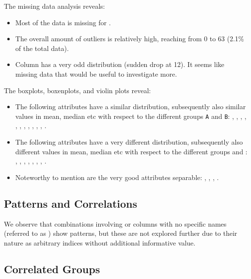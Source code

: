 The missing data analysis reveals:
\begin{itemize}
  \item Most of the data is missing for .
  \item The overall amount of outliers is relatively high, reaching from 0 to 63 (2.1\% of the total data).
  \item Column  has a very odd distribution (sudden drop at 12). It seems like missing data that would be useful to investigate more.
\end{itemize}

The boxplots, boxenplots, and violin plots reveal:
\begin{itemize}
  \item The following attributes have a similar distribution, subsequently also similar values in mean, median etc with respect to the different groups \texttt{A} and \texttt{B}: , , , , , , , , , , , .
  \item The following attributes have a very different distribution, subsequently also different values in mean, median etc with respect to the different groups  and : , , , , , , , .
  \item Noteworthy to mention are the very good attributes separable: , , , .
\end{itemize}



\subsection*{Patterns and Correlations}

We observe that combinations involving  or columns with no specific names (referred to as ) show patterns, but these are not explored further due to their nature as arbitrary indices without additional informative value.

\subsection*{Correlated Groups}

